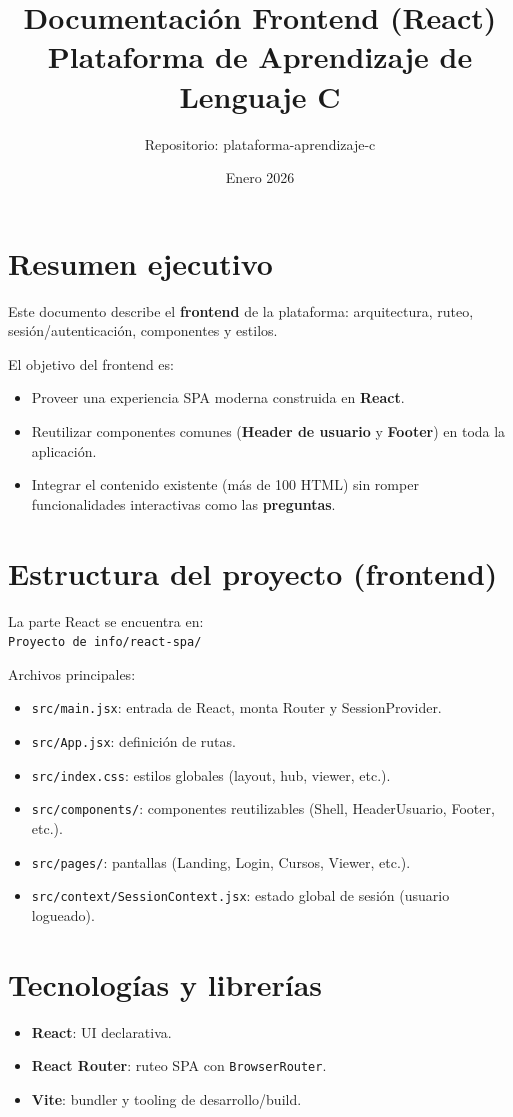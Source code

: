 \documentclass[12pt,a4paper]{article}
\title{Documentaci\'on Frontend (React)\\Plataforma de Aprendizaje de Lenguaje C}
\author{Repositorio: plataforma-aprendizaje-c}
\date{Enero 2026}
\begin{document}
\maketitle
\tableofcontents
\newpage

\section{Resumen ejecutivo}
Este documento describe el \textbf{frontend} de la plataforma: arquitectura, ruteo, sesi\'on/autenticaci\'on, componentes y estilos.

El objetivo del frontend es:
\begin{itemize}[leftmargin=*]
  \item Proveer una experiencia SPA moderna construida en \textbf{React}.
  \item Reutilizar componentes comunes (\textbf{Header de usuario} y \textbf{Footer}) en toda la aplicaci\'on.
  \item Integrar el contenido existente (m\'as de 100 HTML) sin romper funcionalidades interactivas como las \textbf{preguntas}.
\end{itemize}

\section{Estructura del proyecto (frontend)}
La parte React se encuentra en:\\
\texttt{Proyecto de info/react-spa/}

Archivos principales:
\begin{itemize}[leftmargin=*]
  \item \texttt{src/main.jsx}: entrada de React, monta Router y SessionProvider.
  \item \texttt{src/App.jsx}: definici\'on de rutas.
  \item \texttt{src/index.css}: estilos globales (layout, hub, viewer, etc.).
  \item \texttt{src/components/}: componentes reutilizables (Shell, HeaderUsuario, Footer, etc.).
  \item \texttt{src/pages/}: pantallas (Landing, Login, Cursos, Viewer, etc.).
  \item \texttt{src/context/SessionContext.jsx}: estado global de sesi\'on (usuario logueado).
\end{itemize}

\section{Tecnolog\'ias y librer\'ias}
\begin{itemize}[leftmargin=*]
  \item \textbf{React}: UI declarativa.
  \item \textbf{React Router}: ruteo SPA con \texttt{BrowserRouter}.
  \item \textbf{Vite}: bundler y tooling de desarrollo/build.
\end{itemize}
\end{document}
